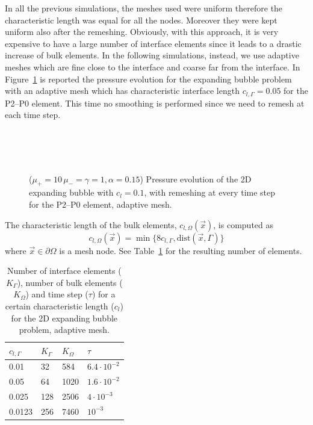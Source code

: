 \documentclass[a4paper,12pt,onecolumn]{article}
\begin{document}
In all the previous simulations, the meshes used were uniform therefore the
characteristic length was equal for all the nodes. Moreover they were kept
uniform also after the remeshing. Obviously, with this approach, it is very
expensive to have a large number of interface elements since it leads to a
drastic increase of bulk elements. In the following simulations, instead, we use
adaptive meshes which are fine close to the interface and coarse far from the
interface. In Figure~\ref{fig:expanding_bubble_adaptive} is reported the
pressure evolution for the expanding bubble problem with an adaptive mesh which
has characteristic interface length $c_{l,\Gamma}=0.05$ for the P2--P0 element.
This time no smoothing is performed since we need to remesh at each time step.
\begin{figure}[htbp]
  \centering
  \\
  \quad
  \\
  \quad
  \\
  \caption{($\mu_+ = 10\,\mu_- = \gamma = 1,\alpha = 0.15$) Pressure evolution
of the 2D expanding bubble with $c_l=0.1$, with remeshing at every time step
for the P2--P0 element, adaptive mesh.}
  \label{fig:expanding_bubble_adaptive}
\end{figure}

The characteristic length of the bulk elements, $c_{l,\Omega}(\vec{x})$, is
computed as
\begin{equation}\label{eq:adaptive_criteria}
 c_{l,\Omega}(\vec{x})=\min\big\{8c_{l,\Gamma},\textrm{dist}(\vec{x},\Gamma)\big\}
\end{equation}
where $\vec{x}\in\partial\Omega$ is a mesh node. See
Table~\ref{tab:expandingbubble2Delements_adaptive} for the resulting number of
elements.
\begin{table}
 \center
\begin{tabular}{llll}
\hline
$c_{l,\Gamma}$ & $K_\Gamma$ & $K_\Omega$ & $\tau$ \\
\hline
0.01 & 32 & 584 & $6.4\cdot10^{-2}$ \\
0.05 & 64 & 1020 & $1.6\cdot10^{-2}$ \\
0.025 & 128 & 2506 & $4\cdot10^{-3}$\\
0.0123 & 256 & 7460 & $10^{-3}$\\
\hline
\end{tabular}
\caption{Number of interface elements ($K_\Gamma$), number of bulk elements
($K_\Omega$) and time step ($\tau$) for a certain characteristic length ($c_l$)
for the 2D expanding bubble problem, adaptive mesh.}
\label{tab:expandingbubble2Delements_adaptive}
\end{table}
\end{document}
